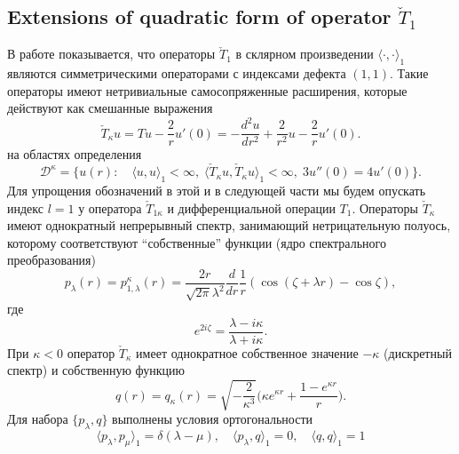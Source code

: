 \documentclass[12pt]{article}
\newcommand{\DD}{\mathcal{D}}
\begin{document}
\subsection{Extensions of quadratic form of operator $ \check{T}_{1} $}
    В работе
\cite{Inv}
    показывается, что операторы
$ \check{T}_{1} $
    в склярном произведении
$ \langle \cdot , \cdot \rangle_{1} $
    являются симметрическими операторами с индексами дефекта
$ (1,1) $.
    Такие операторы имеют нетривиальные самосопряженные расширения,
    которые действуют как смешанные выражения
\begin{equation*}
    \check{T}_{\kappa} u = T u - \frac{2}{r} u'(0)
    = -\frac{d^{2}u}{dr^{2}} + \frac{2}{r^{2}} u -\frac{2}{r}u'(0) .
\end{equation*}
    на областях определения
\begin{equation}
\label{cTb}
    \DD^{\kappa} = \{u(r): \quad \langle u,u\rangle_{1} < \infty, \;
	\langle \check{T}_{\kappa} u, \check{T}_{\kappa} u\rangle_{1} <\infty,
	\; 3u''(0) = 4u'(0) \} .
\end{equation}
    Для упрощения обозначений в этой и в следующей части
    мы будем опускать индекс
$ l=1 $
    у оператора
$ \check{T}_{1\kappa} $
    и дифференциальной операции
$ T_{1} $.
    Операторы
$ \check{T}_{\kappa} $
    имеют однократный непрерывный спектр, занимающий нетрицательную полуось,
    которому соответствуют ``собственные'' функции (ядро спектрального
    преобразования)
\begin{equation*}
\label{Tpl}
    p_{\lambda}(r) = p_{1,\lambda}^{\kappa}(r)
        = \frac{2r}{\sqrt{2\pi}\lambda^{2}} \frac{d}{dr}\frac{1}{r}
    (\cos(\zeta +\lambda r) - \cos\zeta) ,
\end{equation*}
    где
\begin{equation*}
    e^{2i\zeta} = \frac{\lambda - i\kappa}{\lambda + i\kappa}.
\end{equation*}
    При
$ \kappa < 0 $
    оператор
$ \check{T}_{\kappa} $
    имеет однократное собственное значение
$ -\kappa $
    (дискретный спектр) и собственную функцию
\begin{equation*}
    q(r) = q_{\kappa}(r)
    = \sqrt{-\frac{2}{\kappa^{3}}}
        \bigl(\kappa e^{\kappa r} + \frac{1-e^{\kappa r}}{r}\bigr) .
\end{equation*}
    Для набора
$ \{p_{\lambda}, q \} $
    выполнены условия ортогональности
\begin{equation*}
    \langle p_{\lambda} , p_{\mu} \rangle_{1} = \delta(\lambda-\mu) ,
    \quad \langle p_{\lambda} , q \rangle_{1} = 0 ,
    \quad \langle q , q \rangle_{1} = 1
\end{equation*}
\end{document}
